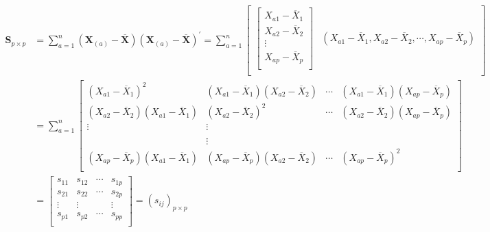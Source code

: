 \documentclass[12pt]{book}
\begin{document}
\begin{align*}

    \mathbf{S}_{p\times p}
     & = \sum_{a=1}^{n}{\left(\mathbf{X}_{\left(a\right)}-\overline{\mathbf{X}}\right)\left(\mathbf{X}_{\left(a\right)}-\overline{\mathbf{X}}\right)^\prime}
    = \sum_{a=1}^{n}
    \begin{bmatrix}
        \begin{bmatrix}
            X_{a1}-{\overline{X}}_1 \\
            X_{a2}-{\overline{X}}_2 \\
            \vdots             \\
            X_{ap}-{\overline{X}}_p \\
        \end{bmatrix}
         & \left(X_{a1}-{\overline{X}}_1,X_{a2}-{\overline{X}}_2,\cdots,X_{ap}-{\overline{X}}_p\right) \\
    \end{bmatrix}                                                                                                                              \\
     & = \sum_{a=1}^{n}
    \begin{bmatrix}
        \left(X_{a1}-{\overline{X}}_1\right)^2
         & \left(X_{a1}-{\overline{X}}_1\right)\left(X_{a2}-{\overline{X}}_2\right)
         & \cdots
         & \left(X_{a1}-{\overline{X}}_1\right)\left(X_{ap}-{\overline{X}}_p\right) \\

        \left(X_{a2}-{\overline{X}}_2\right)\left(X_{a1}-{\overline{X}}_1\right)
         & \left(X_{a2}-{\overline{X}}_2\right)^2
         & \cdots
         & \left(X_{a2}-{\overline{X}}_2\right)\left(X_{ap}-{\overline{X}}_p\right) \\
        \vdots
         & \vdots                                                         \\
         & \                                                              \\
         & \vdots                                                         \\
        \left(X_{ap}-{\overline{X}}_p\right)\left(X_{a1}-{\overline{X}}_1\right)
         & \left(X_{ap}-{\overline{X}}_p\right)\left(X_{a2}-{\overline{X}}_2\right)
         & \cdots
         & \left(X_{ap}-{\overline{X}}_p\right)^2                              \\
    \end{bmatrix}                                                                                                                               \\
     & = \begin{bmatrix}
        s_{11} & s_{12} & \cdots & s_{1p} \\
        s_{21} & s_{22} & \cdots & s_{2p} \\
        \vdots & \vdots & \      & \vdots \\
        s_{p1} & s_{p2} & \cdots & s_{pp} \\
    \end{bmatrix}
    = \left(s_{ij}\right)_{p\times p}
\end{align*}
\end{document}
